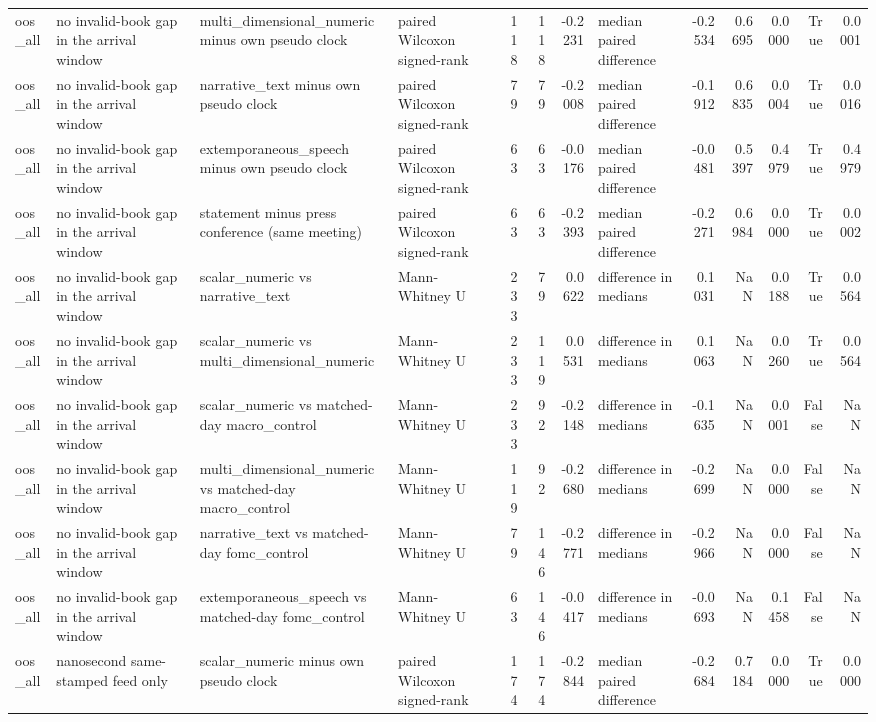 \begin{tabular}{llllrrrlrrrrr}
oos_all & no invalid-book gap in the arrival window & multi_dimensional_numeric minus own pseudo clock & paired Wilcoxon signed-rank & 118 & 118 & -0.2231 & median paired difference & -0.2534 & 0.6695 & 0.0000 & True & 0.0001 \\
oos_all & no invalid-book gap in the arrival window & narrative_text minus own pseudo clock & paired Wilcoxon signed-rank & 79 & 79 & -0.2008 & median paired difference & -0.1912 & 0.6835 & 0.0004 & True & 0.0016 \\
oos_all & no invalid-book gap in the arrival window & extemporaneous_speech minus own pseudo clock & paired Wilcoxon signed-rank & 63 & 63 & -0.0176 & median paired difference & -0.0481 & 0.5397 & 0.4979 & True & 0.4979 \\
oos_all & no invalid-book gap in the arrival window & statement minus press conference (same meeting) & paired Wilcoxon signed-rank & 63 & 63 & -0.2393 & median paired difference & -0.2271 & 0.6984 & 0.0000 & True & 0.0002 \\
oos_all & no invalid-book gap in the arrival window & scalar_numeric vs narrative_text & Mann-Whitney U & 233 & 79 & 0.0622 & difference in medians & 0.1031 & NaN & 0.0188 & True & 0.0564 \\
oos_all & no invalid-book gap in the arrival window & scalar_numeric vs multi_dimensional_numeric & Mann-Whitney U & 233 & 119 & 0.0531 & difference in medians & 0.1063 & NaN & 0.0260 & True & 0.0564 \\
oos_all & no invalid-book gap in the arrival window & scalar_numeric vs matched-day macro_control & Mann-Whitney U & 233 & 92 & -0.2148 & difference in medians & -0.1635 & NaN & 0.0001 & False & NaN \\
oos_all & no invalid-book gap in the arrival window & multi_dimensional_numeric vs matched-day macro_control & Mann-Whitney U & 119 & 92 & -0.2680 & difference in medians & -0.2699 & NaN & 0.0000 & False & NaN \\
oos_all & no invalid-book gap in the arrival window & narrative_text vs matched-day fomc_control & Mann-Whitney U & 79 & 146 & -0.2771 & difference in medians & -0.2966 & NaN & 0.0000 & False & NaN \\
oos_all & no invalid-book gap in the arrival window & extemporaneous_speech vs matched-day fomc_control & Mann-Whitney U & 63 & 146 & -0.0417 & difference in medians & -0.0693 & NaN & 0.1458 & False & NaN \\
oos_all & nanosecond same-stamped feed only & scalar_numeric minus own pseudo clock & paired Wilcoxon signed-rank & 174 & 174 & -0.2844 & median paired difference & -0.2684 & 0.7184 & 0.0000 & True & 0.0000 \\

\end{tabular}
